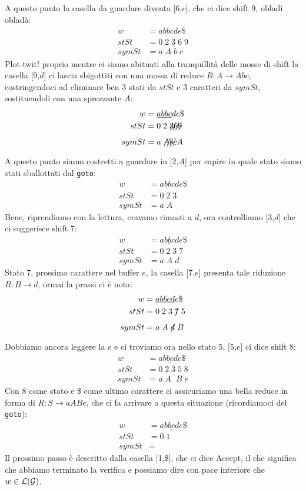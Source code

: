 \documentclass[class=book, crop=false, oneside, 12pt]{standalone}
\begin{document}
A questo punto la casella da guardare diventa [6,\(c\)], che ci dice shift 9, obladì obladà:
\begin{align*}
    w &= \underline{abbc}de\$ \\
    stSt &= 0\;2\;3\;6\;9\\
    symSt &= a\;A\;b\;c
\end{align*}
Plot-twit! proprio mentre ci siamo abituati alla tranquillità delle mosse di shift la casella [9,\(d\)] ci lascia sbigottiti con una mossa di reduce \(R: A \to Abc\), costringendoci ad eliminare ben 3 stati da \(stSt\) e 3 caratteri da \(symSt\), sostituendoli con una sprezzante \(A\):
\begin{align*}
    w &= \underline{abbc}de\$ \\
    stSt &= 0\;2\;\xout{369}\\
    symSt &= a\;\xout{Abc}A
\end{align*}
A questo punto siamo costretti a guardare in [2,\(A\)] per capire in quale stato siamo stati sballottati dal \texttt{goto}:
\begin{align*}
    w &= \underline{abbc}de\$ \\
    stSt &= 0\;2\;3\\
    symSt &= a\;A
\end{align*}
Bene, riprendiamo con la lettura, eravamo rimasti a \(d\), ora controlliamo [3,\(d\)] che ci suggerisce shift 7:
\begin{align*}
    w &= \underline{abbcd}e\$ \\
    stSt &= 0\;2\;3\;7\\
    symSt &= a\;A\;d
\end{align*}
Stato 7, prossimo carattere nel buffer \(e\), la casella [7,\(e\)] presenta tale riduzione \(R: B\to d\), ormai la prassi ci è nota:
\begin{align*}
    w &= \underline{abbcd}e\$ \\
    stSt &= 0\;2\;3\;\xout{7}\;5\\
    symSt &= a\;A\;\xout{d}\;B
\end{align*}
Dobbiamo ancora leggere la \(e\) e ci troviamo ora nello stato 5, [5,\(e\)] ci dice shift 8:
\begin{align*}
    w &= \underline{abbcde}\$ \\
    stSt &= 0\;2\;3\;5\;8\\
    symSt &= a\;A\;\;B\;e
\end{align*}
Con 8 come stato e \$ come ultimo carattere ci assicuriamo una bella reduce in forma di \(R: S \to aABe\), che ci fa arrivare a questa situazione (ricordiamoci del \texttt{goto}):
\begin{align*}
    w &= \underline{abbcde}\$ \\
    stSt &= 0\;1\\
    symSt &= 
\end{align*}
Il prossimo passo è descritto dalla casella [1,\$], che ci dice Accept, il che significa che abbiamo terminato la verifica e possiamo dire con pace interiore che \(w \in \mathcal{L}(\mathcal{G})\).
\end{document}
